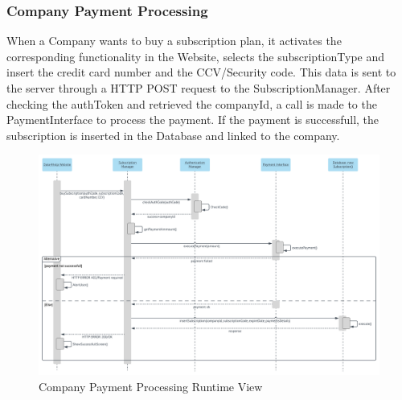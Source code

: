 \subsubsection{Company Payment Processing}
When a Company wants to buy a subscription plan, it activates the corresponding functionality in the Website, selects the subscriptionType and insert the credit card number and the CCV/Security code. This data is sent to the server through a HTTP POST request to the SubscriptionManager. After checking the authToken and retrieved the companyId, a call is made to the PaymentInterface to process the payment. If the payment is successfull, the subscription is inserted in the Database and linked to the company.
\begin{figure}[H]
	\includegraphics[width=\textwidth,height=\textheight,keepaspectratio]{assets/flowCharts/CompanyPaymentProcessing.pdf}
	\caption{Company Payment Processing Runtime View}
	\label{fig:CompanyPaymentProcessing}
\end{figure}


